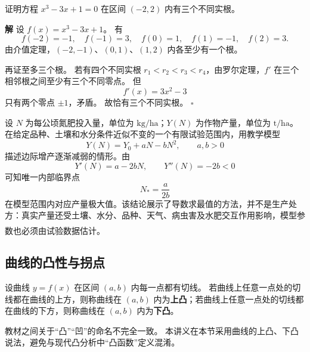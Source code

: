 \documentclass[fontset=fandol]{ctexart}
\newenvironment{solution}{\par\noindent\textbf{解}\quad}{\hfill$\square$\par\vspace{0.8em}}
\newcommand{\upcite}[1]{\textsuperscript{\textsuperscript{\cite{#1}}}}
\begin{document}
\begin{example}[证明方程根的个数]
证明方程 $x^3-3x+1=0$ 在区间 $(-2,2)$ 内有三个不同实根。
\end{example}
\begin{solution}
设 $f(x)=x^3-3x+1$。 有
\[
f(-2)=-1,\quad f(-1)=3,\quad f(0)=1,\quad f(1)=-1,\quad f(2)=3.
\]
由介值定理，$(-2,-1)$、$(0,1)$、$(1,2)$ 内各至少有一个根。

再证至多三个根。 若有四个不同实根 $r_1<r_2<r_3<r_4$，由罗尔定理，$f'$ 在三个相邻根之间至少有三个不同零点。 但
\[
f'(x)=3x^2-3
\]
只有两个零点 $\pm1$，矛盾。 故恰有三个不同实根。
\end{solution}

\begin{application}[农业：简化的最佳施肥量模型]
设 $N$ 为每公顷氮肥投入量，单位为 $\mathrm{kg/ha}$；$Y(N)$ 为作物产量，单位为 $\mathrm{t/ha}$。在给定品种、土壤和水分条件近似不变的一个有限试验范围内，用教学模型
\[
Y(N)=Y_0+aN-bN^2,\qquad a,b>0
\]
描述边际增产逐渐减弱的情形。由
\[
Y'(N)=a-2bN,\qquad Y''(N)=-2b<0
\]
可知唯一内部临界点
\[
N_*=\frac{a}{2b}
\]
在模型范围内对应产量极大值。该结论展示了导数求最值的方法，并不是生产处方：真实产量还受土壤、水分、品种、天气、病虫害及水肥交互作用影响，模型参数也必须由试验数据估计。\upcite{TaizPlant}
\end{application}

\subsection{曲线的凸性与拐点}

\begin{definition}[曲线的上凸与下凸]
设曲线 $y=f(x)$ 在区间 $(a,b)$ 内每一点都有切线。 若曲线上任意一点处的切线都在曲线的上方，则称曲线在 $(a,b)$ 内为\textbf{上凸}；若曲线上任意一点处的切线都在曲线的下方，则称曲线在 $(a,b)$ 内为\textbf{下凸}。

教材之间关于“凸”“凹”的命名不完全一致。 本讲义在本节采用曲线的上凸、下凸说法，避免与现代凸分析中“凸函数”定义混淆。
\end{definition}
\end{document}
